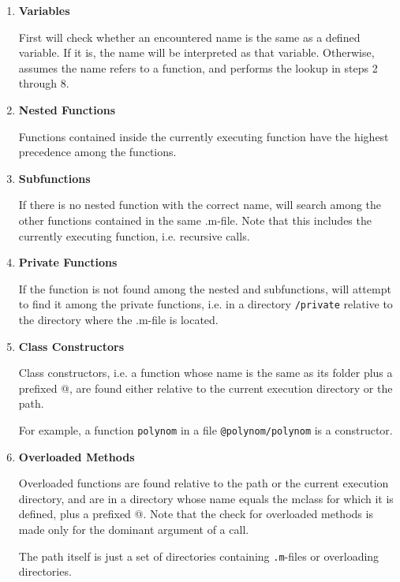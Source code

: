 \begin{enumerate}
\item
\textbf{      Variables}

      First \matlab will check whether an encountered name is the same as a defined variable.
      If it is, the name will be interpreted as that variable.
      Otherwise, \matlab assumes the name refers to a function, and performs the lookup 
      in steps 2 through 8.
\item
\textbf{      Nested Functions}

      Functions contained inside the currently executing function have
      the highest precedence among the functions.

\item
\textbf{      Subfunctions}

      If there is no nested function with the correct name, \matlab will search
      among the other functions contained in the same .m-file. Note that this
      includes the currently executing function, i.e. recursive calls. %
\item
\textbf{      Private Functions}

      If the function is not found among the nested and subfunctions, \matlab
      will attempt to find it among the private functions, i.e. in a directory
      {\tt /private} relative to the directory where the .m-file is located.

\item
\textbf{      Class Constructors}

      Class constructors, i.e. a function whose name is the same as its folder plus a prefixed @,
      are found either relative to the current execution directory or the \matlab path.

      For example, a function {\tt polynom} in a file {\tt @polynom/polynom} is a constructor.

\item
\textbf{      Overloaded Methods}

      Overloaded functions are found relative to the path or the current execution directory,
      and are in a directory whose name equals the mclass for which it is defined, plus a 
      prefixed @. Note that the check for overloaded methods is made only for the dominant
      argument of a call.

      The path itself is just a set of directories containing {\tt .m}-files or overloading directories.


\end{enumerate}
